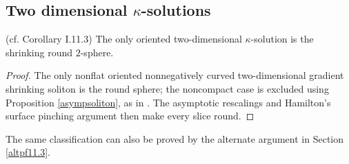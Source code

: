\subsection{Two dimensional $\kappa$-solutions} \label{I.11.3}
\begin{corollary}
\label{cor:kl-two-dimensional-solutions-kappa-solutions-corollary}

(cf. Corollary I.11.3) \label{2Dsoliton}
The only oriented two-dimensional $\kappa$-solution is the shrinking round
$2$-sphere.
\end{corollary}
\begin{proof}
\sketch The only nonflat oriented nonnegatively curved two-dimensional
gradient shrinking soliton is the round sphere; the noncompact case is
excluded using Proposition \ref{asympsoliton}, as in \cite{Ye2}.  The
asymptotic rescalings and Hamilton's surface pinching argument
\cite{Hamsurface} then make
every slice round.
\end{proof}
\begin{remark}
\label{rem:kl-two-dimensional-solutions-structural-remark-ricci-solitons}


The same classification can also be proved by the alternate argument in
Section \ref{altpf11.3}.
\end{remark}

